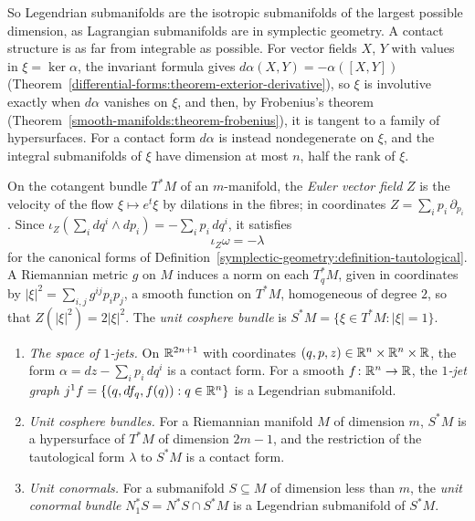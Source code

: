 So Legendrian submanifolds are the isotropic submanifolds of the largest possible dimension, as Lagrangian submanifolds are in symplectic geometry. A contact structure is as far from integrable as
possible. For vector fields $X$, $Y$ with values in $\xi = \ker\alpha$, the invariant formula gives $d\alpha(X, Y) = -\alpha([X, Y])$ (Theorem~\ref{differential-forms:theorem-exterior-derivative}), so $\xi$ is
involutive exactly when $d\alpha$ vanishes on $\xi$, and then, by Frobenius's theorem (Theorem~\ref{smooth-manifolds:theorem-frobenius}), it is tangent to a family of hypersurfaces. For a contact form $d\alpha$ is
instead nondegenerate on $\xi$, and the integral submanifolds of $\xi$ have dimension at most $n$, half the rank of $\xi$.

On the cotangent bundle $T^*M$ of an $m$-manifold, the \emph{Euler vector field} $Z$ is the velocity of the flow $\xi \mapsto e^t\xi$ by dilations in the fibres; in coordinates $Z = \sum_ip_i\,\partial_{p_i}$.
Since $\iota_Z(\sum_idq^i \wedge dp_i) = -\sum_ip_i\,dq^i$, it satisfies
\[
\iota_Z\omega = -\lambda
\]
for the canonical forms of Definition~\ref{symplectic-geometry:definition-tautological}. A Riemannian metric $g$ on $M$ induces a norm on each $T^*_qM$, given in coordinates by $|\xi|^2 = \sum_{i,j}g^{ij}p_ip_j$,
a smooth function on $T^*M$, homogeneous of degree $2$, so that $Z(|\xi|^2) = 2|\xi|^2$. The \emph{unit cosphere bundle} is $S^*M = \{\xi \in T^*M : |\xi| = 1\}$.

\begin{proposition}\label{symplectic-geometry:proposition-contact-examples}
\begin{enumerate}
\item \emph{The space of $1$-jets.} On $\mathbb{R}^{2n+1}$ with coordinates $(q, p, z) \in \mathbb{R}^n \times \mathbb{R}^n \times \mathbb{R}$, the form $\alpha = dz - \sum_ip_i\,dq^i$ is a contact form. For a smooth $f \colon \mathbb{R}^n \to \mathbb{R}$, the
\emph{$1$-jet graph} $j^1f = \{(q, df_q, f(q)) : q \in \mathbb{R}^n\}$ is a Legendrian submanifold.
\item \emph{Unit cosphere bundles.} For a Riemannian manifold $M$ of dimension $m$, $S^*M$ is a hypersurface of $T^*M$ of dimension $2m - 1$, and the restriction of the tautological form $\lambda$ to $S^*M$
is a contact form.
\item \emph{Unit conormals.} For a submanifold $S \subseteq M$ of dimension less than $m$, the \emph{unit conormal bundle} $N^*_1S = N^*S \cap S^*M$ is a Legendrian submanifold of $S^*M$.
\end{enumerate}
\end{proposition}

